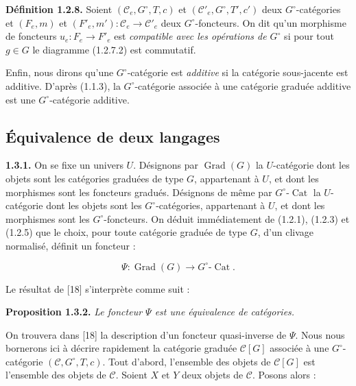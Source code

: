 %
\noindent\textbf{Définition 1.2.8.}\quad
Soient $(\mathcal C_e,G^\circ,T,c)$ et
$(\mathcal C'_e,G^\circ,T',c')$ deux $G^\circ$-catégories et
$(F_e,m)$ et $(F'_e,m')\colon\mathcal C_e\to\mathcal C'_e$ deux
$G^\circ$-foncteurs. On dit qu'un morphisme de foncteurs
$u_e\colon F_e\to F'_e$ est \emph{compatible avec les opérations de
$G^\circ$} si pour tout $g\in G$ le diagramme (1.2.7.2) est commutatif.

Enfin, nous dirons qu'une $G^\circ$-catégorie est \emph{additive} si la
catégorie sous-jacente est additive. D'après (1.1.3), la
$G^\circ$-catégorie associée à une catégorie graduée additive est une
$G^\circ$-catégorie additive.

\subsection{Équivalence de deux langages}

\noindent\textbf{1.3.1.}\quad
On se fixe un univers $U$. Désignons par $\operatorname{Grad}(G)$ la
$U$-catégorie dont les objets sont les catégories graduées de type $G$,
appartenant à $U$, et dont les morphismes sont les foncteurs gradués.
Désignons de même par $G^\circ\text{-}\operatorname{Cat}$ la
$U$-catégorie dont les objets sont les $G^\circ$-catégories, appartenant
à $U$, et dont les morphismes sont les $G^\circ$-foncteurs. On déduit
immédiatement de (1.2.1), (1.2.3) et (1.2.5) que le choix, pour toute
catégorie graduée de type $G$, d'un clivage normalisé, définit un
foncteur :

\begin{equation}
  \Psi\colon \operatorname{Grad}(G)
  \longrightarrow G^\circ\text{-}\operatorname{Cat}.
  \tag{1.3.1.1}
\end{equation}

Le résultat de [18] s'interprète comme suit :

\noindent\textbf{Proposition 1.3.2.}\quad
\emph{Le foncteur $\Psi$ est une équivalence de catégories.}

On trouvera dans [18] la description d'un foncteur quasi-inverse de
$\Psi$. Nous nous bornerons ici à décrire rapidement la catégorie
graduée $\mathcal C[G]$ associée à une $G^\circ$-catégorie
$(\mathcal C,G^\circ,T,c)$. Tout d'abord, l'ensemble des objets de
$\mathcal C[G]$ est l'ensemble des objets de $\mathcal C$. Soient $X$ et
$Y$ deux objets de $\mathcal C$. Posons alors :

